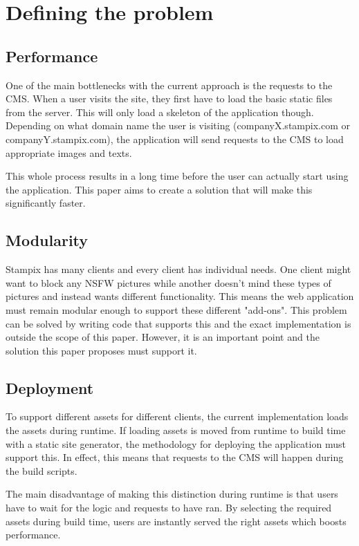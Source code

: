 
\chapter{Defining the problem} %

\label{Chapter2} 


\section{Performance}

One of the main bottlenecks with the current approach is the requests to the CMS. When a user visits the site, they first have to load the basic static files from the server. 
This will only load a skeleton of the application though. Depending on what domain name the user is visiting (companyX.stampix.com or companyY.stampix.com), the application will send requests to the CMS to load appropriate images and texts.

This whole process results in a long time before the user can actually start using the application. This paper aims to create a solution that will make this significantly faster.

\section{Modularity}

Stampix has many clients and every client has individual needs. One client might want to block any NSFW pictures while another doesn't mind these types of pictures and instead wants different functionality.
This means the web application must remain modular enough to support these different "add-ons". This problem can be solved by writing code that supports this and the exact implementation is outside the scope of this paper. 
However, it is an important point and the solution this paper proposes must support it.

\section{Deployment}

To support different assets for different clients, the current implementation loads the assets during runtime. 
If loading assets is moved from runtime to build time with a static site generator, the methodology for deploying the application must support this. 
In effect, this means that requests to the CMS will happen during the build scripts.

The main disadvantage of making this distinction during runtime is that users have to wait for the logic and requests to have ran.
By selecting the required assets during build time, users are instantly served the right assets which boosts performance.